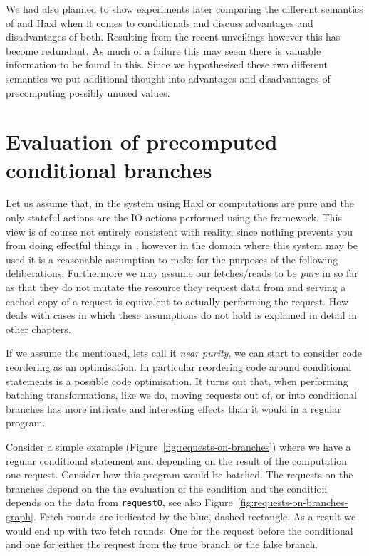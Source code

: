 We had also planned to show experiments later comparing the different semantics of \yauhau{} and Haxl when it comes to conditionals and discuss advantages and disadvantages of both.
Resulting from the recent unveilings however this has become redundant.
As much of a failure this may seem there is valuable information to be found in this.
Since we hypothesised these two different semantics we put additional thought into advantages and disadvantages of precomputing possibly unused values.


\section{Evaluation of precomputed conditional branches}

Let us assume that, in the system using Haxl or \yauhau{} computations are pure and the only stateful actions are the IO actions performed using the framework.
This view is of course not entirely consistent with reality, since nothing prevents you from doing effectful things in \yauhau{}, however in the domain where this system may be used it is a reasonable assumption to make for the purposes of the following deliberations.
Furthermore we may assume our fetches/reads to be \textit{pure} in so far as that they do not mutate the resource they request data from and serving a cached copy of a request is equivalent to actually performing the request.
How \yauhau{} deals with cases in which these assumptions do not hold is explained in detail in other chapters.

If we assume the mentioned, lets call it \textit{near purity}, we can start to consider code reordering as an optimisation.
In particular reordering code around conditional statements is a possible code optimisation.
It turns out that, when performing batching transformations, like we do, moving requests out of, or into conditional branches has more intricate and interesting effects than it would in a regular program.

Consider a simple example (Figure~\ref{fig:requests-on-branches}) where we have a regular conditional statement and depending on the result of the computation one request.
Consider how this program would be batched.
The requests on the branches depend on the the evaluation of the condition and the condition depends on the data from \texttt{request0}, see also Figure~\ref{fig:requests-on-branches-graph}.
Fetch rounds are indicated by the blue, dashed rectangle.
As a result we would end up with two fetch rounds.
One for the request before the conditional and one for either the request from the true branch or the false branch.

